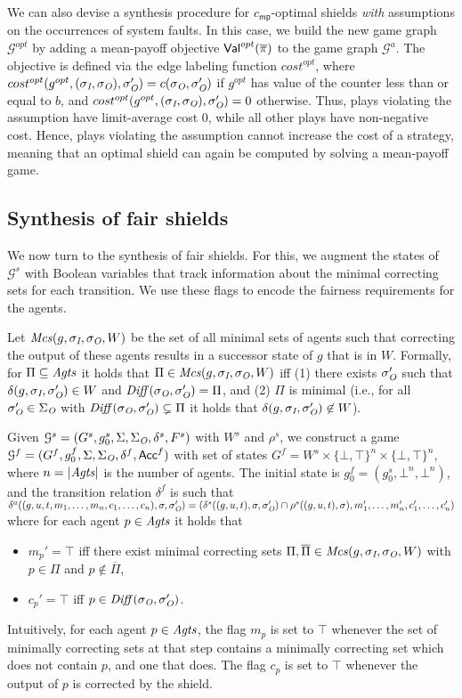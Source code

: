 We can also devise a synthesis procedure for $c_{\mathsf{mp}}$-optimal shields \emph{with} assumptions on the occurrences of system faults. In this case, we build the new game graph $\mathcal G^{opt}$ by adding a mean-payoff objective $\mathsf{Val}^{opt}(\overline{\pi})$ to the game graph $\mathcal G^{a}$. The objective is defined via the edge labeling function $cost^{opt}$, where $cost^{opt}(g^{opt},(\sigma_{\textit{I}},\sigma_{\textit{O}}),\sigma_{\textit{O}}') = c(\sigma_{\textit{O}},\sigma_{\textit{O}}')$ if $g^{opt}$ has value of the counter less than or equal to $b$, and $cost^{opt}(g^{opt},(\sigma_{\textit{I}},\sigma_{\textit{O}}),\sigma_{\textit{O}}') = 0$ otherwise. Thus, plays violating the assumption  have limit-average cost $0$, while all other plays have non-negative cost. Hence, plays violating the assumption cannot increase the cost of a strategy, meaning that an optimal shield can again be computed by solving a mean-payoff game.
\fi

\subsection{Synthesis of fair shields}
We now turn to the synthesis of fair shields. For this, we augment the states of $\mathcal G^s$  with Boolean variables that track information about the minimal correcting sets for each transition.  We use these flags to encode the fairness requirements for the  agents.

Let $\mathit{Mcs}(g,\sigma_{\textit{I}},\sigma_{\textit{O}},W)$ be the set of all minimal sets of agents such that correcting the output of these agents results in a successor state of $g$ that is in $W$.
Formally, for $\Pi \subseteq \mathit{Agts}$ it holds that $\Pi \in \mathit{Mcs}(g,\sigma_{\textit{I}},\sigma_{\textit{O}},W)$ iff (1) there exists $\sigma_{\textit{O}}'$ such that $\delta(g,\sigma_{\textit{I}},\sigma_{\textit{O}}') \in W$ and $\mathit{Diff}(\sigma_{\textit{O}},\sigma_{\textit{O}}') = \Pi$, and (2) $\Pi$ is minimal
(i.e., for all $\sigma_{\textit{O}}' \in\Sigma_{\textit{O}}$ with $\mathit{Diff}(\sigma_{\textit{O}},\sigma_{\textit{O}}') \subsetneq \Pi$ it holds that $\delta(g,\sigma_{\textit{I}},\sigma_{\textit{O}}') \not\in W$).

Given  $\mathcal G^s = (G^s, g_0^s,\Sigma,\Sigma_{\textit{O}},\delta^s,F^s)$ with $W^s$ and $\rho^s$,
we construct a game $\mathcal G^{f} = (G^f, g_0^f,\Sigma,\Sigma_{\textit{O}},\delta^{f}, \mathsf{Acc}^{f})$ with
set of states $G^f = W^s \times \{\bot,\top\}^n\times \{\bot,\top\}^n$, where $n = |\mathit{Agts}|$ is the number of agents.
The initial state is $g_0^f = (g_0^s,\bot^n,\bot^n)$, and
the transition relation $\delta^{f}$ is such that
%
$\delta^{a}((g,u,t,m_1,\ldots,m_n,c_1,\ldots,c_n),\sigma,\sigma_{\textit{O}}')=(\delta^s((g,u,t), \sigma,\sigma_{\textit{O}}')\cap\rho^s((g,u,t), \sigma),m_1',\ldots,m_n',c_1',\ldots,c_n')$ where for each agent $p \in \mathit{Agts}$ it holds that
\begin{itemize}
\item $m_p'= \top$ iff there exist minimal correcting sets $\Pi,\overline \Pi\in \mathit{Mcs}(g,\sigma_{\textit{I}},\sigma_{\textit{O}},W)$  with $p \in \Pi$ and $p \not \in \overline \Pi$, 
\item $c_p' = \top$ iff $p\in \mathit{Diff}(\sigma_{\textit{O}}, \sigma_{\textit{O}}')$.
\end{itemize}
Intuitively, for each agent $p \in \mathit{Agts}$, the  flag $m_p$ is set to $\top$ whenever the set of  minimally correcting sets at that step contains a  minimally correcting set which does not contain $p$, and one that does. The flag $c_p$ is set to $\top$ whenever the output of $p$ is corrected by the shield.

